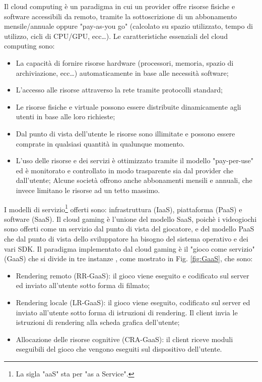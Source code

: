 Il cloud computing è un paradigma in cui un provider offre risorse fisiche e software accessibili da remoto, tramite la sottoscrizione di un abbonamento mensile/annuale oppure "pay-as-you go" (calcolato su spazio utilizzato, tempo di utilizzo, cicli di CPU/GPU, ecc\dots). 
Le caratteristiche essenziali del cloud computing sono:

\begin{itemize}
	\item La capacità di fornire risorse hardware (processori, memoria, spazio di archiviazione, ecc\dots) automaticamente in base alle necessità software;
	\item L'accesso alle risorse attraverso la rete tramite protocolli standard;
	\item Le risorse fisiche e virtuale possono essere distribuite dinamicamente agli utenti in base alle loro richieste;
	\item Dal punto di vista dell'utente le risorse sono illimitate e possono essere comprate in qualsiasi quantità in qualunque momento.
	\item L'uso delle risorse e dei servizi è ottimizzato tramite il modello "pay-per-use" ed è monitorato e controllato in modo trasparente sia dal provider che dall'utente; Alcune società offrono anche abbonamenti mensili e annuali, che invece limitano le risorse ad un tetto massimo.
\end{itemize}

I modelli di servizio\footnote{La sigla "aaS" sta per "as a Service".} offerti sono: infrastruttura (IaaS), piattaforma (PaaS) e software (SaaS). Il cloud gaming è l'unione del modello SaaS, poichè i videogiochi sono offerti come un servizio dal punto di vista del giocatore, e del modello PaaS che dal punto di vista dello sviluppatore ha bisogno del sistema operativo e dei vari SDK. Il paradigma implementato dal cloud gaming è il "gioco come servizio" (GaaS) che si divide in tre instanze \parencite{Cloud_for_Gaming}, come mostrato in Fig. \ref{fig:GaaS}, che sono:

\begin{itemize}
	\item Rendering remoto (RR-GaaS): il gioco viene eseguito e codificato sul server ed inviato all'utente sotto forma di filmato;
	\item Rendering locale (LR-GaaS): il gioco viene eseguito, codificato sul server ed inviato all'utente sotto forma di istruzioni di rendering. Il client invia le istruzioni di rendering alla scheda grafica dell'utente;
	\item Allocazione delle risorse cognitive (CRA-GaaS): il client riceve moduli eseguibili del gioco che vengono eseguiti sul dispositivo dell'utente.
\end{itemize}

